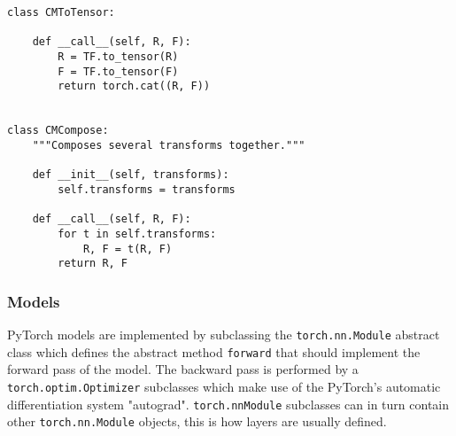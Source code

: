 \documentclass[../main.tex]{subfiles}
\begin{document}
\begin{lstlisting}
class CMToTensor:

    def __call__(self, R, F):
        R = TF.to_tensor(R)
        F = TF.to_tensor(F)
        return torch.cat((R, F))


class CMCompose:
    """Composes several transforms together."""

    def __init__(self, transforms):
        self.transforms = transforms

    def __call__(self, R, F):
        for t in self.transforms:
            R, F = t(R, F)
        return R, F

\end{lstlisting}

\subsubsection{Models}
PyTorch models are implemented by subclassing the \verb|torch.nn.Module|
abstract class which defines the abstract method \verb|forward| that
should implement the forward pass of the model.
The backward pass is performed by a \verb|torch.optim.Optimizer| subclasses
which make use of the PyTorch's automatic differentiation system "autograd".
\verb|torch.nnModule| subclasses can in turn contain other \verb|torch.nn.Module|
objects, this is how layers are usually defined.
\end{document}
